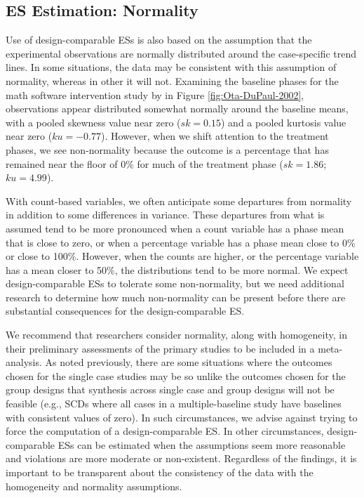 \documentclass[
]{book}
\begin{document}
\hypertarget{es-estimation-normality}{%
\subsection{ES Estimation: Normality}\label{es-estimation-normality}}

Use of design-comparable ESs is also based on the assumption that the experimental observations are normally distributed around the case-specific trend lines. In some situations, the data may be consistent with this assumption of normality, whereas in other it will not. Examining the baseline phases for the math software intervention study by \citet{ota2002Task} in Figure \ref{fig:Ota-DuPaul-2002}, observations appear distributed somewhat normally around the baseline means, with a pooled skewness value near zero (\(sk = 0.15\)) and a pooled kurtosis value near zero (\(ku = -0.77\)). However, when we shift attention to the treatment phases, we see non-normality because the outcome is a percentage that has remained near the floor of 0\% for much of the treatment phase (\(sk = 1.86\); \(ku = 4.99\)).

With count-based variables, we often anticipate some departures from normality in addition to some differences in variance. These departures from what is assumed tend to be more pronounced when a count variable has a phase mean that is close to zero, or when a percentage variable has a phase mean close to 0\% or close to 100\%. However, when the counts are higher, or the percentage variable has a mean closer to 50\%, the distributions tend to be more normal. We expect design-comparable ESs to tolerate some non-normality, but we need additional research to determine how much non-normality can be present before there are substantial consequences for the design-comparable ES.

We recommend that researchers consider normality, along with homogeneity, in their preliminary assessments of the primary studies to be included in a meta-analysis. As noted previously, there are some situations where the outcomes chosen for the single case studies may be so unlike the outcomes chosen for the group designs that synthesis across single case and group designs will not be feasible (e.g., SCDs where all cases in a multiple-baseline study have baselines with consistent values of zero). In such circumstances, we advise against trying to force the computation of a design-comparable ES. In other circumstances, design-comparable ESs can be estimated when the assumptions seem more reasonable and violations are more moderate or non-existent. Regardless of the findings, it is important to be transparent about the consistency of the data with the homogeneity and normality assumptions.
\end{document}

